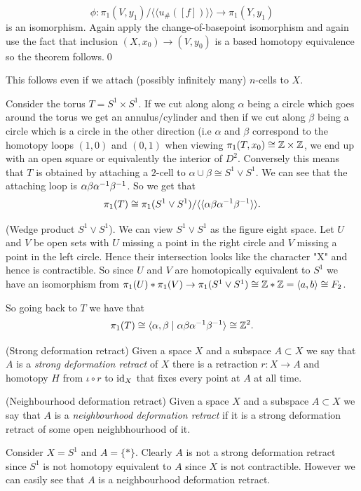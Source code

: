 \documentclass{article}
\begin{document}
\[
  \phi: \pi_1(V,y_1)/\langle\langle u_{\#}([f])\rangle\rangle \to \pi_1(Y,y_1)
\]
is an isomorphism. Again apply the change-of-basepoint isomorphism and again use the fact that inclusion $ (X,x_0) \to (V,y_0) $ is a based homotopy equivalence so the theorem follows.\qed
\begin{remark}
  This follows even if we attach (possibly infinitely many) $ n $-cells to $ X $.
\end{remark}
\begin{example}
  Consider the torus $ T = S^1 \times S^1 $. If we cut along along $ \alpha $ being a circle which goes around the torus we get an annulus/cylinder and then if we cut along $ \beta $ being a circle which is a circle in the other direction (i.e $ \alpha $ and $ \beta $ correspond to the homotopy loops $ (1,0) $ and $ (0,1) $ when viewing $ \pi_1(T,x_0) \cong \mathbb{Z} \times \mathbb{Z} $, we end up with an open square or equivalently the interior of $ D^2 $. Conversely this means that $ T $ is obtained by attaching a $ 2 $-cell to $ \alpha\cup \beta\cong S^1 \vee S^1 $. We can see that the attaching loop is $ \alpha \beta{\alpha}^{-1}{\beta}^{-1} $. So we get that
  \[
    \pi_1(T) \cong \pi_1(S^1 \vee S^1)/ \langle\langle \alpha\beta{\alpha}^{-1}{\beta}^{-1}\rangle\rangle.
  \]
\end{example}
\begin{example}
	(Wedge product $ S^1 \vee S^1 $). We can view $ S^1 \vee S^1 $ as the figure eight space. Let $ U $ and $ V $ be open sets with $ U $ missing a point in the right circle and $ V $ missing a point in the left circle. Hence their intersection looks like the character "X" and hence is contractible. So since $ U $ and $ V $ are homotopically equivalent to $ S^1 $ we have an isomorphism from $ \pi_1(U) * \pi_1(V) \to \pi_1(S^1 \vee S^1) \cong \mathbb{Z} * \mathbb{Z} = \langle a,b\rangle \cong F_2 $.
\end{example}
So going back to $ T $ we have that
\[
  \pi_1(T)\cong \langle \alpha,\beta \mid \alpha\beta {\alpha}^{-1}{\beta}^{-1}\rangle \cong \mathbb{Z}^2.
\]
\begin{definition}
	(Strong deformation retract) Given a space $ X $ and a subspace $ A\subset X $ we say that $ A $ is a \textit{strong deformation retract} of $ X $ there is a retraction $ r: X \to A $ and homotopy $ H $ from $ \iota \circ r $ to $ \mathrm{id}_X $ that fixes every point at $ A $ at all time.
\end{definition}
\begin{definition}
	(Neighbourhood deformation retract) Given a space $ X $ and a subspace $ A\subset X $ we say that $ A $ is a \textit{neighbourhood deformation retract} if it is a strong deformation retract of some open neighbhourhood of it.
\end{definition}
\begin{example}
	Consider $ X = S^1 $ and $ A = \{*\} $. Clearly $ A $ is not a strong deformation retract since $ S^1 $ is not homotopy equivalent to $ A $ since $ X $ is not contractible. However we can easily see that $ A $ is a neighbourhood deformation retract.
\end{example}
\end{document}
